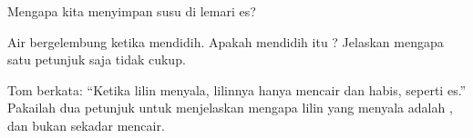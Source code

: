 \begin{exercise}[$\star$]\label{exo:g5:irreversible-changes:9}
Mengapa kita menyimpan susu di lemari es?
\end{exercise}

\begin{exercise}[$\star\star$]\label{exo:g5:irreversible-changes:10}
Air bergelembung ketika mendidih. Apakah mendidih itu ?
Jelaskan mengapa satu petunjuk saja tidak cukup.
\end{exercise}

\begin{exercise}[$\star\star$]\label{exo:g5:irreversible-changes:11}
Tom berkata: ``Ketika lilin menyala, lilinnya hanya mencair dan habis,
seperti es.'' Pakailah dua petunjuk untuk menjelaskan mengapa lilin yang
menyala adalah , dan bukan sekadar mencair.
\end{exercise}
